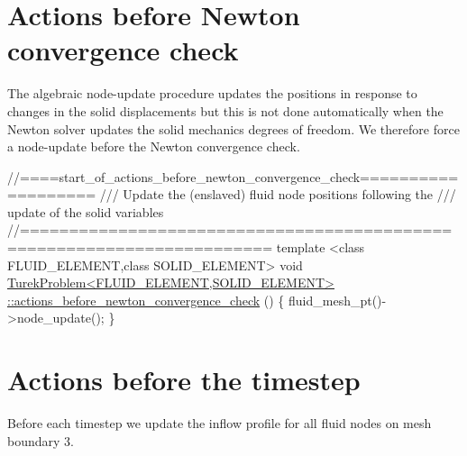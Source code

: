 



 

 \hypertarget{index_check}{}\section{Actions before Newton convergence check}\label{index_check}
The algebraic node-\/update procedure updates the positions in response to changes in the solid displacements but this is not done automatically when the Newton solver updates the solid mechanics degrees of freedom. We therefore force a node-\/update before the Newton convergence check.

 
\begin{DoxyCodeInclude}
\textcolor{comment}{//====start\_of\_actions\_before\_newton\_convergence\_check===================}
\textcolor{comment}{/// Update the (enslaved) fluid node positions following the}
\textcolor{comment}{}\textcolor{comment}{/// update of the solid variables}
\textcolor{comment}{}\textcolor{comment}{//=======================================================================}
\textcolor{keyword}{template} <\textcolor{keyword}{class} FLUID\_ELEMENT,\textcolor{keyword}{class} SOLID\_ELEMENT> 
\textcolor{keywordtype}{void} \hyperlink{classTurekProblem_aa896171b1a817ca35cba9b723bb15ed2}{TurekProblem<FLUID\_ELEMENT,SOLID\_ELEMENT>}
\hyperlink{classTurekProblem_aa896171b1a817ca35cba9b723bb15ed2}{::actions\_before\_newton\_convergence\_check} ()
\{
 fluid\_mesh\_pt()->node\_update();
\}

\end{DoxyCodeInclude}




 

\hypertarget{index_timestep}{}\section{Actions before the timestep}\label{index_timestep}
Before each timestep we update the inflow profile for all fluid nodes on mesh boundary 3.


